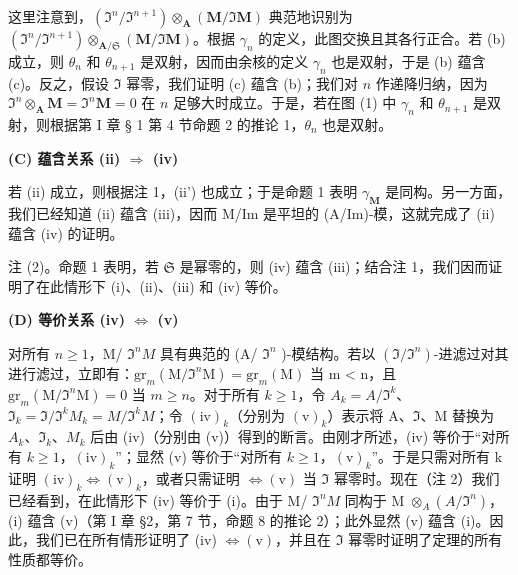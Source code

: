 这里注意到，\((\mathfrak{I}^n / \mathfrak{I}^{n+1}) \otimes_{\mathbf{A}} (\mathbf{M} / \mathfrak{I}\mathbf{M})\) 典范地识别为 \((\mathfrak{I}^n / \mathfrak{I}^{n+1}) \otimes_{\mathbf{A} / \mathfrak{S}} (\mathbf{M} / \mathfrak{I}\mathbf{M})\)。根据 \(\gamma_n\) 的定义，此图交换且其各行正合。若 (b) 成立，则 \(\theta_n\) 和 \(\theta_{n+1}\) 是双射，因而由余核的定义 \(\gamma_n\) 也是双射，于是 (b) 蕴含 (c)。反之，假设 \(\mathfrak{I}\) 幂零，我们证明 (c) 蕴含 (b)；我们对 \(n\) 作递降归纳，因为 \(\mathfrak{I}^n \otimes_{\mathbf{A}} \mathbf{M} = \mathfrak{I}^n\mathbf{M} = 0\) 在 \(n\) 足够大时成立。于是，若在图 (1) 中 \(\gamma_n\) 和 \(\theta_{n+1}\) 是双射，则根据第 I 章 § 1 第 4 节命题 2 的推论 1，\(\theta_n\) 也是双射。

\textbf{(C) 蕴含关系 (ii) \(\Rightarrow\) (iv)}\par

若 (ii) 成立，则根据注 1，(ii') 也成立；于是命题 1 表明 \(\gamma_{\mathbf{M}}\) 是同构。另一方面，我们已经知道 (ii) 蕴含 (iii)，因而 M/Im 是平坦的 (A/Im)-模，这就完成了 (ii) 蕴含 (iv) 的证明。

注 (2)。命题 1 表明，若 \(\mathfrak{S}\) 是幂零的，则 (iv) 蕴含 (iii)；结合注 1，我们因而证明了在此情形下 (i)、(ii)、(iii) 和 (iv) 等价。

\textbf{(D) 等价关系 (iv) \(\Leftrightarrow\) (v)}\par

  对所有 \(n \geqslant 1\)，M/ \(\Im^{n}M\) 具有典范的 (A/ \(\Im^{n}\) )-模结构。若以 \((\Im/\Im^{n})\)-进滤过对其进行滤过，立即有：\(\mathrm{gr}_{m}(\mathrm{M}/\Im^{n}\mathrm{M}) = \mathrm{gr}_{m}(\mathrm{M})\) 当 m \textless{} n，且 \(\mathrm{gr}_{m}(\mathrm{M}/\Im^{n}\mathrm{M}) = 0\) 当 \(m \geqslant n\)。对于所有 \(k \geqslant 1\)，令 \(A_{k} = A/\Im^{k}\)、\(\Im_{k} = \Im/\Im^{k} M_{k} = M/\Im^{k} M\)；令 \((\mathrm{iv})_{k}\)（分别为 \((\mathrm{v})_{k}\)）表示将 A、\(\Im\)、M 替换为 \(A_{k}\)、\(\Im_{k}\)、\(M_{k}\) 后由 (iv)（分别由 (v)）得到的断言。由刚才所述，(iv) 等价于“对所有 \(k \geqslant 1\)，\((\mathrm{iv})_{k}\)”；显然 (v) 等价于“对所有 \(k \geqslant 1\)，\((\mathrm{v})_{k}\)”。于是只需对所有 k 证明 \((\mathrm{iv})_{k} \Leftrightarrow (\mathrm{v})_{k}\)，或者只需证明 \(\Leftrightarrow (\mathrm{v})\) 当 \(\Im\) 幂零时。现在（注 2）我们已经看到，在此情形下 (iv) 等价于 (i)。由于 M/ \(\Im^{n}M\) 同构于 M \(\otimes_{A} (A/\Im^{n})\)，(i) 蕴含 (v)（第 I 章 §2，第 7 节，命题 8 的推论 2）；此外显然 (v) 蕴含 (i)。因此，我们已在所有情形证明了 (iv) \(\Leftrightarrow (\mathrm{v})\)，并且在 \(\Im\) 幂零时证明了定理的所有性质都等价。

